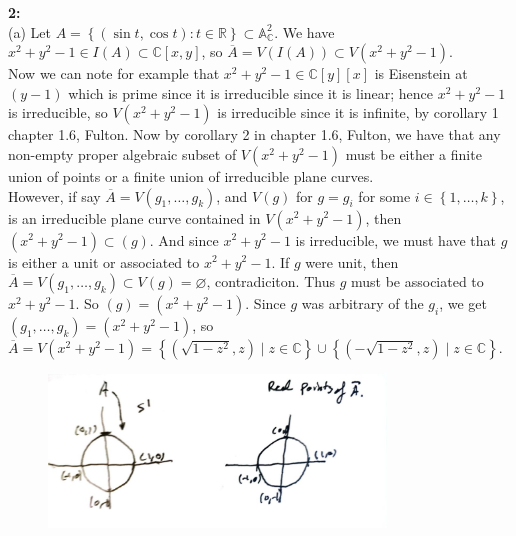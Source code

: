 \documentclass[a4paper]{article}
\begin{document}
    \linebreak
    \textbf{2:}\\
    (a) Let $A = \left\{ \left( \sin t, \cos t \right)  \colon t \in \mathbb{R}
    \right\} \subset \mathbb{A}_{\mathbb{C}}^2  $.  We have
    $x^2 + y^2 -1 \in I(A) \subset \mathbb{C} \left[ x,y \right] $, so
    $\overline{A} = V\left( I\left( A \right)  \right) \subset 
    V\left( x^2 + y^2 -1 \right)$.\\
    Now we can note for example that
    $x^2 + y^2 -1 \in \mathbb{C}[y][x]$ is Eisenstein at $(y-1)$ which is
    prime since it is irreducible since it is linear; hence
    $x^2 + y^2 -1$ is irreducible, so $V(x^2 + y^2 -1)$ is irreducible since
    it is infinite, by corollary 1 chapter 1.6, Fulton. Now by corollary 2
    in chapter 1.6, Fulton, we have that any non-empty proper algebraic subset
    of $V\left( x^2 + y^2 -1 \right) $ must be either a finite union of
    points or a finite union of irreducible plane curves.\\
    However,
    if say $\overline{A} = V \left( g_1, \ldots, g_k \right) $, and $V(g)$ for
    $g = g_i$ for some $i \in \left\{ 1,\ldots,k \right\} $,
    is an irreducible plane curve contained in $V(x^2 + y^2 -1)$,
    then
    $(x^2 + y^2 -1) \subset (g)$. And since $x^2 + y^2 -1$ is irreducible, we
    must have that $g$ is either a unit or associated to $x^2 + y^2 -1$.
    If $g$ were unit, then $\overline{A} = V\left( g_1, \ldots, g_k \right) 
    \subset V(g) = \varnothing$, contradiciton. Thus $g$ must be associated to
    $x^2 + y^2 -1$. So $(g) = \left( x^2 + y^2 -1 \right) $. Since $g$ was
    arbitrary of the $g_i$, we get
    $(g_1, \ldots, g_k) =  (x^2 + y^2 -1)$, so
    $\overline{A} = V\left( x^2 + y^2 -1 \right) 
    = \left\{ \left( \sqrt{1 - z^2} , z \right)  \mid z \in \mathbb{C} \right\} 
    \cup \left\{ \left( - \sqrt{1-z^2} ,z \right)  \mid z \in \mathbb{C} \right\} $.\\

    \begin{figure}[H]
        \centering
        \includegraphics[width=0.8\textwidth]{1.jpg}
        \label{fig:1-jpg}
    \end{figure}
\end{document}
